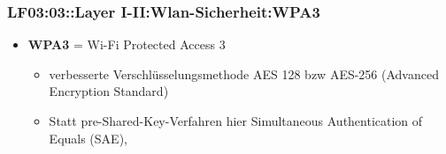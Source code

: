 \begin{frame}  
  \frametitle{LF03:03::Layer I-II:Wlan-Sicherheit:WPA3}

  
  \begin{itemize}
     \item \textbf{WPA3} = Wi-Fi Protected Access 3
    \begin{itemize}
      \item verbesserte Verschlüsselungsmethode AES 128 bzw AES-256 (Advanced Encryption Standard) 
      \item Statt pre-Shared-Key-Verfahren hier Simultaneous Authentication of Equals (SAE),
    \end{itemize}    
  \end{itemize}

\end{frame}